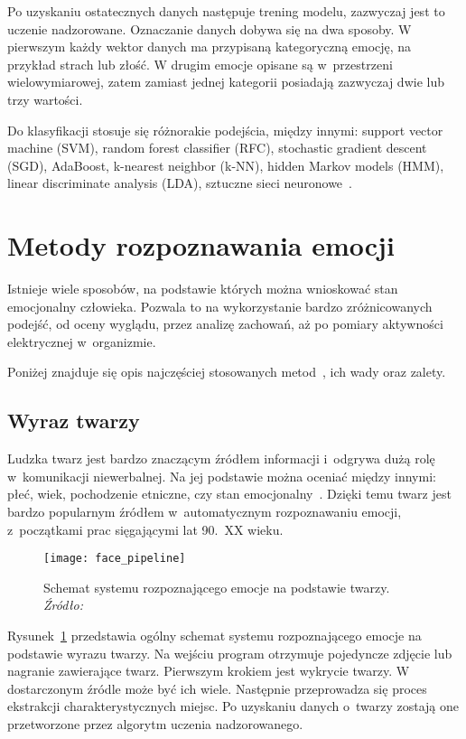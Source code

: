 Po uzyskaniu ostatecznych danych następuje trening modelu, zazwyczaj jest to uczenie nadzorowane.
Oznaczanie danych dobywa się na dwa sposoby.
W pierwszym każdy wektor danych ma przypisaną kategoryczną emocję, na przykład strach lub złość.
W drugim emocje opisane są w~przestrzeni wielowymiarowej, zatem zamiast jednej kategorii posiadają zazwyczaj dwie lub trzy wartości.

Do klasyfikacji stosuje się różnorakie podejścia, między innymi: support vector machine (SVM), random forest classifier (RFC), stochastic gradient descent (SGD), AdaBoost, k-nearest neighbor (k-NN), hidden Markov models (HMM), linear discriminate analysis (LDA), sztuczne sieci neuronowe~\cite{Varghese2015, Dzedzickis2020, Ko2018}.

\section{Metody rozpoznawania emocji}
\label{sec:metody-rozpoznawania-emocji}

Istnieje wiele sposobów, na podstawie których można wnioskować stan emocjonalny człowieka.
Pozwala to na wykorzystanie bardzo zróżnicowanych podejść, od oceny wyglądu, przez analizę zachowań, aż po pomiary aktywności elektrycznej w~organizmie.

Poniżej znajduje się opis najczęściej stosowanych metod~\cite{Varghese2015, Dzedzickis2020}, ich wady oraz zalety.

\subsection{Wyraz twarzy}\label{subsec:wyraz-twarzy}
Ludzka twarz jest bardzo znaczącym źródłem informacji i~odgrywa dużą rolę w~komunikacji niewerbalnej.
Na jej podstawie można oceniać między innymi: płeć, wiek, pochodzenie etniczne, czy stan emocjonalny~\cite{Calvo2015}.
Dzięki temu twarz jest bardzo popularnym źródłem w~automatycznym rozpoznawaniu emocji, z~początkami prac sięgającymi lat 90.\ XX wieku.

\begin{figure}[h]
    \centering
    \texttt{[image: face\_pipeline]}
    \caption{Schemat systemu rozpoznającego emocje na podstawie twarzy. \textit{Źródło:~\cite{Ko2018}}}
    \label{fig:face-pipeline}
\end{figure}

Rysunek~\ref{fig:face-pipeline} przedstawia ogólny schemat systemu rozpoznającego emocje na podstawie wyrazu twarzy.
Na wejściu program otrzymuje pojedyncze zdjęcie lub nagranie zawierające twarz.
Pierwszym krokiem jest wykrycie twarzy.
W dostarczonym źródle może być ich wiele.
Następnie przeprowadza się proces ekstrakcji charakterystycznych miejsc.
Po uzyskaniu danych o~twarzy zostają one przetworzone przez algorytm uczenia nadzorowanego.

